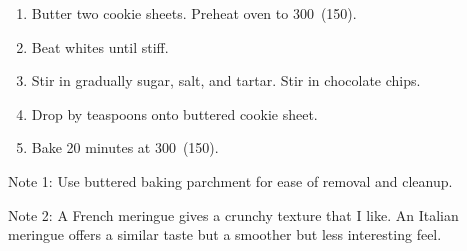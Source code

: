 
\begin{ingredients}
\end{ingredients}


\begin{recipe}
  \begin{enumerate}

  \item Butter two cookie sheets.  Preheat oven to 300\F\ (150\C).

  \item Beat whites until stiff.

  \item Stir in gradually sugar, salt, and tartar.
    Stir in chocolate chips.

  \item Drop by teaspoons onto buttered cookie sheet.

  \item Bake 20 minutes at 300\F\ (150\C).

  \end{enumerate}
\end{recipe}

Note 1: Use buttered baking parchment for ease of removal and cleanup.

Note 2: A French meringue gives a crunchy texture that I like.  An Italian meringue offers a similar taste but a smoother but less interesting feel.